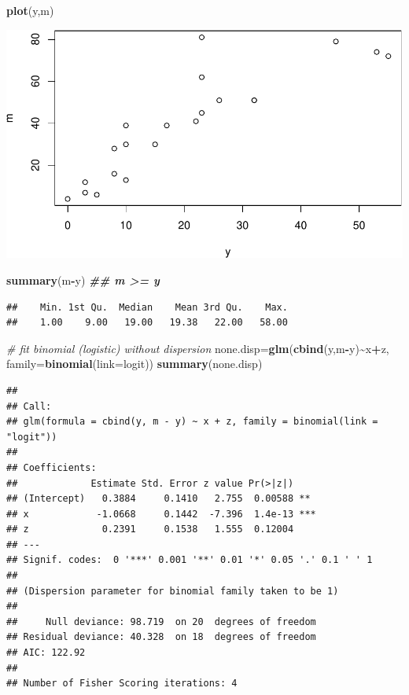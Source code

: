 \documentclass[
]{article}
\newenvironment{Shaded}{\begin{snugshade}}{\end{snugshade}}
\newcommand{\AttributeTok}[1]{\textcolor[rgb]{0.13,0.29,0.53}{#1}}
\newcommand{\CommentTok}[1]{\textcolor[rgb]{0.56,0.35,0.01}{\textit{#1}}}
\newcommand{\DocumentationTok}[1]{\textcolor[rgb]{0.56,0.35,0.01}{\textbf{\textit{#1}}}}
\newcommand{\FunctionTok}[1]{\textcolor[rgb]{0.13,0.29,0.53}{\textbf{#1}}}
\newcommand{\NormalTok}[1]{#1}
\newcommand{\OtherTok}[1]{\textcolor[rgb]{0.56,0.35,0.01}{#1}}
\newcommand{\SpecialCharTok}[1]{\textcolor[rgb]{0.81,0.36,0.00}{\textbf{#1}}}
\newcommand{\StringTok}[1]{\textcolor[rgb]{0.31,0.60,0.02}{#1}}
\begin{document}
\begin{Shaded}
\begin{Highlighting}[]
\FunctionTok{plot}\NormalTok{(y,m)}
\end{Highlighting}
\end{Shaded}

\includegraphics{yc4384_hw3_files/figure-latex/unnamed-chunk-3-2.pdf}

\begin{Shaded}
\begin{Highlighting}[]
\FunctionTok{summary}\NormalTok{(m}\SpecialCharTok{{-}}\NormalTok{y) }\DocumentationTok{\#\# m \textgreater{}= y}
\end{Highlighting}
\end{Shaded}

\begin{verbatim}
##    Min. 1st Qu.  Median    Mean 3rd Qu.    Max. 
##    1.00    9.00   19.00   19.38   22.00   58.00
\end{verbatim}

\begin{Shaded}
\begin{Highlighting}[]
\CommentTok{\# fit binomial (logistic) without dispersion}
\NormalTok{none.disp}\OtherTok{=}\FunctionTok{glm}\NormalTok{(}\FunctionTok{cbind}\NormalTok{(y,m}\SpecialCharTok{{-}}\NormalTok{y)}\SpecialCharTok{\textasciitilde{}}\NormalTok{x}\SpecialCharTok{+}\NormalTok{z, }\AttributeTok{family=}\FunctionTok{binomial}\NormalTok{(}\AttributeTok{link=}\StringTok{\textquotesingle{}logit\textquotesingle{}}\NormalTok{))}
\FunctionTok{summary}\NormalTok{(none.disp)}
\end{Highlighting}
\end{Shaded}

\begin{verbatim}
## 
## Call:
## glm(formula = cbind(y, m - y) ~ x + z, family = binomial(link = "logit"))
## 
## Coefficients:
##             Estimate Std. Error z value Pr(>|z|)    
## (Intercept)   0.3884     0.1410   2.755  0.00588 ** 
## x            -1.0668     0.1442  -7.396  1.4e-13 ***
## z             0.2391     0.1538   1.555  0.12004    
## ---
## Signif. codes:  0 '***' 0.001 '**' 0.01 '*' 0.05 '.' 0.1 ' ' 1
## 
## (Dispersion parameter for binomial family taken to be 1)
## 
##     Null deviance: 98.719  on 20  degrees of freedom
## Residual deviance: 40.328  on 18  degrees of freedom
## AIC: 122.92
## 
## Number of Fisher Scoring iterations: 4
\end{verbatim}
\end{document}
